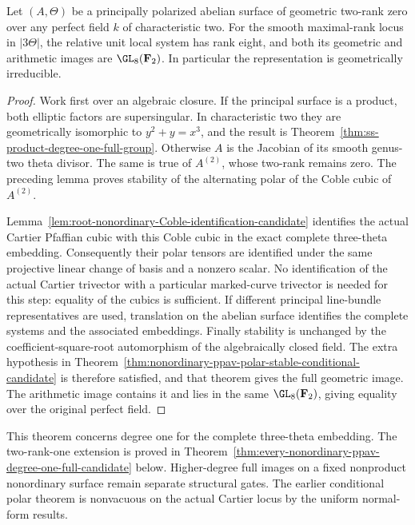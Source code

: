 \begin{theorem}
\label{thm:p-rank-zero-ppav-degree-one-full-candidate}
Let $(A,\Theta)$ be a principally polarized abelian surface of
geometric two-rank zero over any perfect field $k$ of characteristic
two. For the smooth maximal-rank locus in $|3\Theta|$, the relative
unit local system has rank eight, and both its geometric and
arithmetic images are $\GL_8(\mathbf F_2)$.
In particular the representation is geometrically irreducible.
\end{theorem}
\begin{proof}
Work first over an algebraic closure. If the principal surface is
a product, both elliptic factors are supersingular. In characteristic
two they are geometrically isomorphic to $y^2+y=x^3$, and the result
is Theorem~\ref{thm:ss-product-degree-one-full-group}.
Otherwise $A$ is the Jacobian of its smooth genus-two theta divisor.
The same is true of $A^{(2)}$, whose two-rank remains zero.
The preceding lemma proves stability of the alternating polar of
the Coble cubic of $A^{(2)}$.

Lemma~\ref{lem:root-nonordinary-Coble-identification-candidate}
identifies the actual Cartier Pfaffian cubic with this Coble cubic
in the exact complete three-theta embedding. Consequently their
polar tensors are identified under the same projective linear
change of basis and a nonzero scalar. No identification of the
actual Cartier trivector with a particular marked-curve trivector
is needed for this step: equality of the cubics is sufficient.
If different principal line-bundle representatives are used,
translation on the abelian surface identifies the complete systems
and the associated embeddings. Finally stability is unchanged by
the coefficient-square-root automorphism of the algebraically
closed field. The extra hypothesis in
Theorem~\ref{thm:nonordinary-ppav-polar-stable-conditional-candidate}
is therefore satisfied, and that theorem gives the full geometric
image. The arithmetic image contains it and lies in the same
$\GL_8(\mathbf F_2)$, giving equality over the original perfect field.
\end{proof}

\begin{remark}
\label{rem:p-rank-zero-ppav-degree-one-scope-candidate}
This theorem concerns degree one for the complete three-theta
embedding. The two-rank-one extension is proved in
Theorem~\ref{thm:every-nonordinary-ppav-degree-one-full-candidate} below.
Higher-degree full images on a fixed nonproduct nonordinary surface
remain separate structural gates. The earlier conditional polar
theorem is nonvacuous on the actual Cartier locus by the uniform
normal-form results.
\end{remark}
